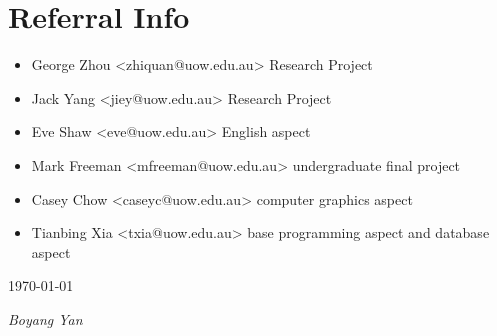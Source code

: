 \documentclass[]{friggeri-cv}
\begin{document}
\section{Referral Info}
\begin{itemize}
	\item George Zhou <zhiquan@uow.edu.au> Research Project
	\item Jack Yang <jiey@uow.edu.au> Research Project
	\item Eve Shaw <eve@uow.edu.au> English aspect
	\item Mark Freeman <mfreeman@uow.edu.au> undergraduate final project
	\item Casey Chow <caseyc@uow.edu.au> computer graphics aspect
	\item Tianbing Xia <txia@uow.edu.au> base programming aspect and database aspect
\end{itemize}











\begin{flushleft}
  \today
\end{flushleft}
\begin{flushright}
\emph{Boyang Yan}
\end{flushright}

% 
\end{document}
